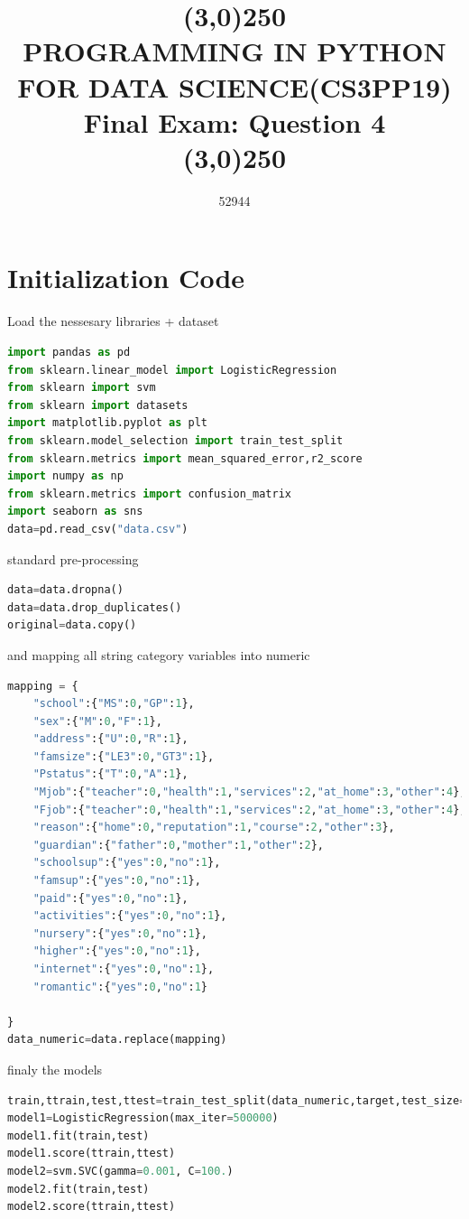 \documentclass[openany]{article}
\title{\line(3,0){250}\\PROGRAMMING IN PYTHON FOR DATA SCIENCE(CS3PP19) \\ Final Exam: Question 4  \\\line(3,0){250}}
\author{52944}
\begin{document}
	\maketitle
	\section{Initialization Code}
		Load the nessesary libraries + dataset
		\begin{lstlisting}[language=Python]
import pandas as pd
from sklearn.linear_model import LogisticRegression
from sklearn import svm
from sklearn import datasets
import matplotlib.pyplot as plt
from sklearn.model_selection import train_test_split
from sklearn.metrics import mean_squared_error,r2_score
import numpy as np
from sklearn.metrics import confusion_matrix
import seaborn as sns
data=pd.read_csv("data.csv")
		\end{lstlisting}
		standard pre-processing
		\begin{lstlisting}[language=Python]
data=data.dropna()
data=data.drop_duplicates()
original=data.copy()
		\end{lstlisting}
		and mapping all string category variables into numeric
		\begin{lstlisting}[language=Python]
mapping = {
	"school":{"MS":0,"GP":1},
	"sex":{"M":0,"F":1},
	"address":{"U":0,"R":1},
	"famsize":{"LE3":0,"GT3":1},
	"Pstatus":{"T":0,"A":1},
	"Mjob":{"teacher":0,"health":1,"services":2,"at_home":3,"other":4},
	"Fjob":{"teacher":0,"health":1,"services":2,"at_home":3,"other":4},
	"reason":{"home":0,"reputation":1,"course":2,"other":3},
	"guardian":{"father":0,"mother":1,"other":2},
	"schoolsup":{"yes":0,"no":1},
	"famsup":{"yes":0,"no":1},
	"paid":{"yes":0,"no":1},
	"activities":{"yes":0,"no":1},
	"nursery":{"yes":0,"no":1},
	"higher":{"yes":0,"no":1},
	"internet":{"yes":0,"no":1},
	"romantic":{"yes":0,"no":1}

}
data_numeric=data.replace(mapping)
		\end{lstlisting}
		finaly the models
		\begin{lstlisting}[language=Python]
train,ttrain,test,ttest=train_test_split(data_numeric,target,test_size=0.2,random_state=1)
model1=LogisticRegression(max_iter=500000)
model1.fit(train,test)
model1.score(ttrain,ttest)
model2=svm.SVC(gamma=0.001, C=100.)
model2.fit(train,test)
model2.score(ttrain,ttest)
		\end{lstlisting}
\end{document}
